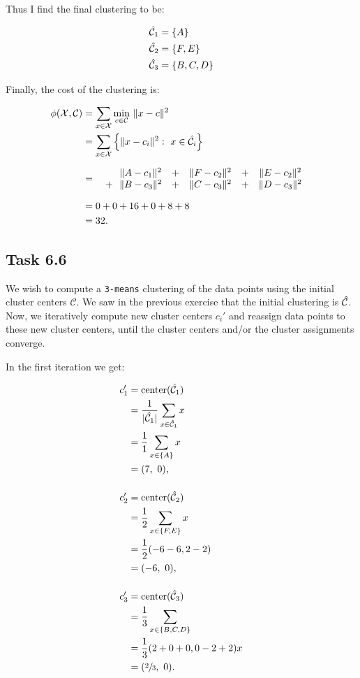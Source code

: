 Thus I find the final clustering to be:

\begin{align*}
\hat{\mathcal{C}}_1 &= \{A\}\\
\hat{\mathcal{C}}_2 &= \{F, E\}\\
\hat{\mathcal{C}}_3 &= \{B, C, D\}\\
\end{align*}

Finally, the cost of the clustering is:

\begin{alignat*}{3}
   \phi(\mathcal X, \mathcal C) &= \sum_{x \in \mathcal X} \min_{c \in \mathcal
  C}\ \lVert x - c \rVert^2\\
  &= \sum_{x \in \mathcal X}\left\{\lVert x - c_i \rVert^2 : \ x \in \hat{\mathcal{C}}_i
  \right\}\\[6pt]
  &= \quad \begin{matrix}
    &\lVert A - c_1 \rVert^2 &+& \lVert F - c_2 \rVert^2 &+& \lVert E - c_2 \rVert^2 & \\
   +\!\! &\lVert B - c_3 \rVert^2 &+& \lVert C - c_3 \rVert^2 &+& \lVert D - c_3 \rVert^2 &
  \end{matrix}\\[6pt]
  &= 0 + 0 + 16 + 0 + 8 + 8\\
  &= 32.
\end{alignat*}

\subsection{Task 6.6}

We wish to compute a \texttt{3-means} clustering of the data points using the
initial cluster centers $\mathcal C$. We saw in the previous exercise that the
initial clustering is $\hat{\mathcal{C}}$. Now, we iteratively compute new cluster centers
$c_i'$ and reassign data points to these new cluster centers, until the cluster
centers and/or the cluster assignments converge.

In the first iteration we get:

\begin{align*}
  c_1' &= \text{center}(\hat{\mathcal{C}}_1)\\
       &= \frac{1}{|\hat{\mathcal{C}}_1|}\sum_{x \in \hat{\mathcal{C}}_1} x\\
       &= \frac{1}{1}\sum_{x \in \{A\}} x\\
       &= (7,\ 0),\\[12pt]
  c_2' &= \text{center}(\hat{\mathcal{C}}_2)\\
       &= \frac{1}{2}\sum_{x \in \{F, E\}} x\\
       &= \frac{1}{2} (-6 -6, 2 -2)\\
       &= (-6,\ 0),\\[12pt]
  c_3' &= \text{center}(\hat{\mathcal{C}}_3)\\
       &= \frac{1}{3}\sum_{x \in \{B, C, D\}}\\
       &= \frac{1}{3}(2 + 0 + 0, 0 - 2 + 2) x\\
       &= (\sfrac{2}{3},\ 0).
\end{align*}

